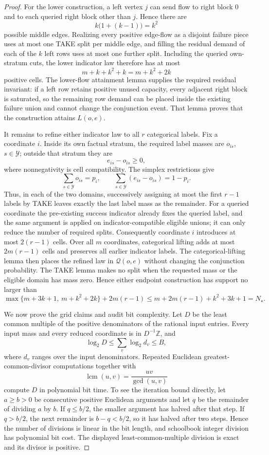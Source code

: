\documentclass{article}
\begin{document}
\begin{proof}
For the lower construction, a left vertex \(j\) can send flow to right block \(0\) and to each queried right block other than \(j\).  Hence there are
\[
k\bigl(1+(k-1)\bigr)=k^2
\]
possible middle edges.  Realizing every positive edge-flow as a disjoint failure piece uses at most one TAKE split per middle edge, and filling the residual demand of each of the \(k\) left rows uses at most one further split.  Including the queried own-stratum cuts, the lower indicator law therefore has at most
\[
m+k+k^2+k=m+k^2+2k
\]
positive cells.  The lower-flow attainment lemma supplies the required residual invariant: if a left row retains positive unused capacity, every adjacent right block is saturated, so the remaining row demand can be placed inside the existing failure union and cannot change the conjunction event.  That lemma proves that the construction attains \(L(o,e)\).

It remains to refine either indicator law to all \(r\) categorical labels.  Fix a coordinate \(i\).  Inside its own factual stratum, the required label masses are \(o_{is}\), \(s\in\mathcal Y\); outside that stratum they are
\[
e_{is}-o_{is}\geq0,
\]
where nonnegativity is cell compatibility.  The simplex restrictions give
\[
\sum_{s\in\mathcal Y}o_{is}=p_i,
\qquad
\sum_{s\in\mathcal Y}(e_{is}-o_{is})=1-p_i.
\]
Thus, in each of the two domains, successively assigning at most the first \(r-1\) labels by TAKE leaves exactly the last label mass as the remainder.  For a queried coordinate the pre-existing success indicator already fixes the queried label, and the same argument is applied on indicator-compatible eligible unions; it can only reduce the number of required splits.  Consequently coordinate \(i\) introduces at most \(2(r-1)\) cells.  Over all \(m\) coordinates, categorical lifting adds at most \(2m(r-1)\) cells and preserves all earlier indicator labels.  The categorical-lifting lemma then places the refined law in \(\mathcal Q(o,e)\) without changing the conjunction probability.  The TAKE lemma makes no split when the requested mass or the eligible domain has mass zero.  Hence either endpoint construction has support no larger than
\[
\max\{m+3k+1,\ m+k^2+2k\}+2m(r-1)
\leq m+2m(r-1)+k^2+3k+1=N_\star.
\]

We now prove the grid claims and audit bit complexity.  Let \(D\) be the least common multiple of the positive denominators of the rational input entries.  Every input mass and every reduced coordinate is in \(D^{-1}\mathbb Z\), and
\[
\log_2D
\leq\sum_{v}\log_2 d_v
\leq B,
\]
where \(d_v\) ranges over the input denominators.  Repeated Euclidean greatest-common-divisor computations together with
\[
\operatorname{lcm}(u,v)=\frac{uv}{\gcd(u,v)}
\]
compute \(D\) in polynomial bit time.  To see the iteration bound directly, let \(a\geq b>0\) be consecutive positive Euclidean arguments and let \(q\) be the remainder of dividing \(a\) by \(b\).  If \(q\leq b/2\), the smaller argument has halved after that step.  If \(q>b/2\), the next remainder is \(b-q<b/2\), so it has halved after two steps.  Hence the number of divisions is linear in the bit length, and schoolbook integer division has polynomial bit cost.  The displayed least-common-multiple division is exact and its divisor is positive.


\end{proof}
\end{document}
